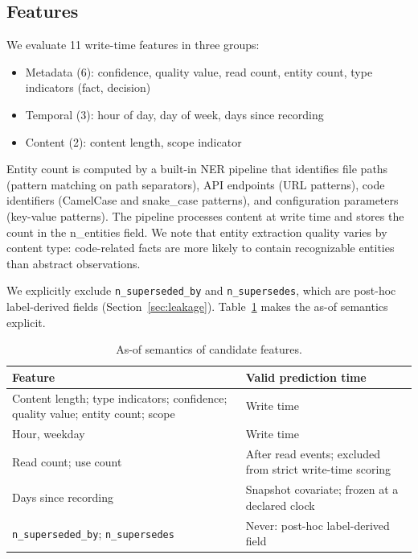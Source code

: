 \documentclass[sigconf,nonacm]{acmart}
\begin{document}
\subsection{Features}
We evaluate 11 write-time features in three groups:
\begin{itemize}
\item Metadata (6): confidence, quality value, read count, entity count, type indicators (fact, decision)
\item Temporal (3): hour of day, day of week, days since recording
\item Content (2): content length, scope indicator
\end{itemize}
Entity count is computed by a built-in NER pipeline that identifies file paths (pattern matching on path separators), API endpoints (URL patterns), code identifiers (CamelCase and snake\_case patterns), and configuration parameters (key-value patterns). The pipeline processes content at write time and stores the count in the n\_entities field. We note that entity extraction quality varies by content type: code-related facts are more likely to contain recognizable entities than abstract observations.

We explicitly exclude \texttt{n\_superseded\_by} and \texttt{n\_supersedes}, which are post-hoc label-derived fields (Section~\ref{sec:leakage}). Table~\ref{tab:asof} makes the as-of semantics explicit.

\begin{table}[h]
\centering
\caption{As-of semantics of candidate features.}
\label{tab:asof}
\begin{tabular}{lp{4.2cm}}
\toprule
Feature & Valid prediction time \\
\midrule
Content length; type indicators; confidence; quality value; entity count; scope & Write time \\
Hour, weekday & Write time \\
Read count; use count & After read events; excluded from strict write-time scoring \\
Days since recording & Snapshot covariate; frozen at a declared clock \\
\texttt{n\_superseded\_by}; \texttt{n\_supersedes} & Never: post-hoc label-derived field \\
\bottomrule
\end{tabular}
\end{table}
\end{document}
